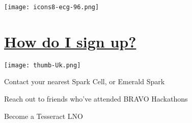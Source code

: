 \documentclass[a4paper]{article}
\begin{document}
{\begin{multicols}{2}
    \columnbreak

        \texttt{[image: icons8-ecg-96.png]}
        
		\section{\underline{How do I sign up?}}
		
		\texttt{[image: thumb-Uk.png]}
			
		\begin{compactitem}
			\item Contact your nearest Spark Cell, or Emerald Spark
			\item Reach out to friends who've attended BRAVO Hackathons
			\item Become a Tesseract LNO

		\end{compactitem}
    
    \end{multicols}
}


 
\end{document}
